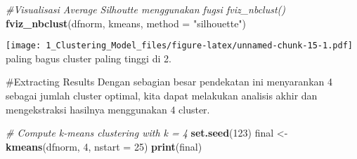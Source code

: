 \documentclass[]{article}
\newenvironment{Shaded}{\begin{snugshade}}{\end{snugshade}}
\newcommand{\CommentTok}[1]{\textcolor[rgb]{0.56,0.35,0.01}{\textit{#1}}}
\newcommand{\DataTypeTok}[1]{\textcolor[rgb]{0.13,0.29,0.53}{#1}}
\newcommand{\DecValTok}[1]{\textcolor[rgb]{0.00,0.00,0.81}{#1}}
\newcommand{\KeywordTok}[1]{\textcolor[rgb]{0.13,0.29,0.53}{\textbf{#1}}}
\newcommand{\NormalTok}[1]{#1}
\newcommand{\StringTok}[1]{\textcolor[rgb]{0.31,0.60,0.02}{#1}}
\begin{document}
\begin{Shaded}
\begin{Highlighting}[]
\CommentTok{#Visualisasi Average Silhoutte menggunakan fugsi fviz_nbclust()}
\KeywordTok{fviz_nbclust}\NormalTok{(dfnorm, kmeans, }\DataTypeTok{method =} \StringTok{"silhouette"}\NormalTok{)}
\end{Highlighting}
\end{Shaded}

\texttt{[image: 1\_Clustering\_Model\_files/figure-latex/unnamed-chunk-15-1.pdf]}
paling bagus cluster paling tinggi di 2.

\#Extracting Results Dengan sebagian besar pendekatan ini menyarankan 4
sebagai jumlah cluster optimal, kita dapat melakukan analisis akhir dan
mengekstraksi hasilnya menggunakan 4 cluster.

\begin{Shaded}
\begin{Highlighting}[]
\CommentTok{# Compute k-means clustering with k = 4}
\KeywordTok{set.seed}\NormalTok{(}\DecValTok{123}\NormalTok{)}
\NormalTok{final <-}\StringTok{ }\KeywordTok{kmeans}\NormalTok{(dfnorm, }\DecValTok{4}\NormalTok{, }\DataTypeTok{nstart =} \DecValTok{25}\NormalTok{)}
\KeywordTok{print}\NormalTok{(final)}
\end{Highlighting}
\end{Shaded}
\end{document}
